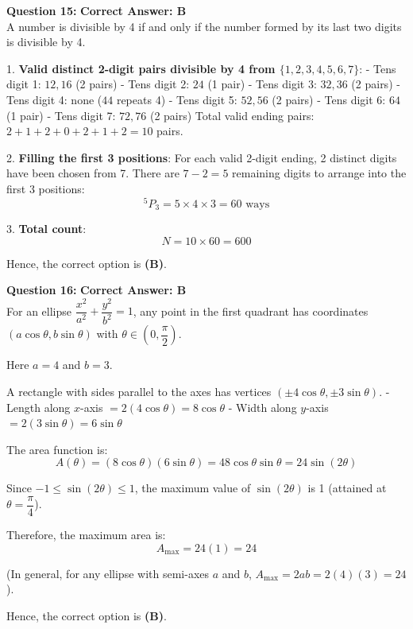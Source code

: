 \documentclass[11pt,a4paper]{article}
\begin{document}
\begin{tcolorbox}[solbox]
\textbf{\textcolor{primaryDark}{Question 15:}} \hfill \textbf{\textcolor{l1Green}{Correct Answer: B}}\\
\vspace{4pt}
A number is divisible by 4 if and only if the number formed by its last two digits is divisible by 4.

1. \textbf{Valid distinct 2-digit pairs divisible by 4 from $\{1, 2, 3, 4, 5, 6, 7\}$}:
- Tens digit 1: $12, 16$ (2 pairs)
- Tens digit 2: $24$ (1 pair)
- Tens digit 3: $32, 36$ (2 pairs)
- Tens digit 4: none ($44$ repeats 4)
- Tens digit 5: $52, 56$ (2 pairs)
- Tens digit 6: $64$ (1 pair)
- Tens digit 7: $72, 76$ (2 pairs)
Total valid ending pairs: $2 + 1 + 2 + 0 + 2 + 1 + 2 = 10$ pairs.

2. \textbf{Filling the first 3 positions}:
For each valid 2-digit ending, 2 distinct digits have been chosen from 7.
There are $7 - 2 = 5$ remaining digits to arrange into the first 3 positions:
$$^5P_3 = 5 \times 4 \times 3 = 60 \text{ ways}$$

3. \textbf{Total count}:
$$N = 10 \times 60 = 600$$

Hence, the correct option is \textbf{(B)}.
\end{tcolorbox}

\begin{tcolorbox}[solbox]
\textbf{\textcolor{primaryDark}{Question 16:}} \hfill \textbf{\textcolor{l1Green}{Correct Answer: B}}\\
\vspace{4pt}
For an ellipse $\dfrac{x^2}{a^2} + \dfrac{y^2}{b^2} = 1$, any point in the first quadrant has coordinates $(a\cos\theta, b\sin\theta)$ with $\theta \in \left(0, \dfrac{\pi}{2}\right)$.

Here $a = 4$ and $b = 3$.

A rectangle with sides parallel to the axes has vertices $(\pm 4\cos\theta, \pm 3\sin\theta)$.
- Length along $x$-axis $= 2(4\cos\theta) = 8\cos\theta$
- Width along $y$-axis $= 2(3\sin\theta) = 6\sin\theta$

The area function is:
$$A(\theta) = (8\cos\theta)(6\sin\theta) = 48\cos\theta\sin\theta = 24\sin(2\theta)$$

Since $-1 \le \sin(2\theta) \le 1$, the maximum value of $\sin(2\theta)$ is 1 (attained at $\theta = \dfrac{\pi}{4}$).

Therefore, the maximum area is:
$$A_{\max} = 24(1) = 24$$

(In general, for any ellipse with semi-axes $a$ and $b$, $A_{\max} = 2ab = 2(4)(3) = 24$).

Hence, the correct option is \textbf{(B)}.
\end{tcolorbox}
\end{document}
